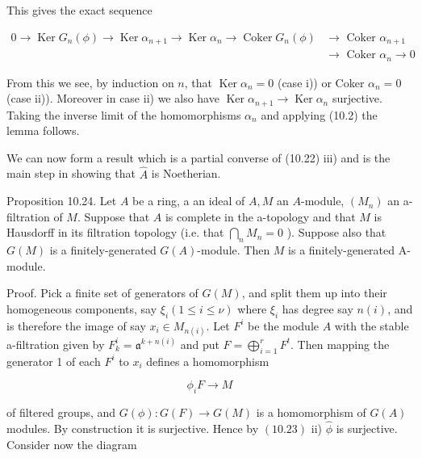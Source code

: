 \documentclass{standalone}
\theoremstyle{definition}
\theoremstyle{remark}
\begin{document}
This gives the exact sequence

\[
\begin{aligned}
0 \rightarrow \operatorname{Ker} G_{n}(\phi) \rightarrow \operatorname{Ker} \alpha_{n+1} \rightarrow \operatorname{Ker} \alpha_{n} \rightarrow \operatorname{Coker} G_{n}(\phi) & \rightarrow \text { Coker } \alpha_{n+1} \\
& \rightarrow \text { Coker } \alpha_{n} \rightarrow 0
\end{aligned}
\]

From this we see, by induction on $n$, that $\operatorname{Ker} \alpha_{n}=0$ (case i)) or Coker $\alpha_{n}=0$ (case ii)). Moreover in case ii) we also have $\operatorname{Ker} \alpha_{n+1} \rightarrow \operatorname{Ker} \alpha_{n}$ surjective. Taking the inverse limit of the homomorphisms $\alpha_{n}$ and applying (10.2) the lemma follows.

We can now form a result which is a partial converse of (10.22) iii) and is the main step in showing that $\hat{A}$ is Noetherian.

Proposition 10.24. Let $A$ be a ring, a an ideal of $A, M$ an $A$-module, $\left(M_{n}\right)$ an a-filtration of $M$. Suppose that $A$ is complete in the a-topology and that $M$ is Hausdorff in its filtration topology (i.e. that $\bigcap_{n} M_{n}=0$ ). Suppose also that $G(M)$ is a finitely-generated $G(A)$-module. Then $M$ is a finitely-generated A-module.

Proof. Pick a finite set of generators of $G(M)$, and split them up into their homogeneous components, say $\xi_{i}(1 \leqslant i \leqslant \nu)$ where $\xi_{i}$ has degree say $n(i)$, and is therefore the image of say $x_{i} \in M_{n(i)}$. Let $F^{i}$ be the module $A$ with the stable a-filtration given by $F_{k}^{i}=\mathfrak{a}^{k+n(i)}$ and put $F=\bigoplus_{i=1}^{r} F^{t}$. Then mapping the generator 1 of each $F^{i}$ to $x_{i}$ defines a homomorphism

\[
\phi_{i} F \rightarrow M
\]

of filtered groups, and $G(\phi): G(F) \rightarrow G(M)$ is a homomorphism of $G(A)$ modules. By construction it is surjective. Hence by $(10.23)$ ii) $\hat{\phi}$ is surjective. Consider now the diagram

\begin{center}
\end{center}
\end{document}
